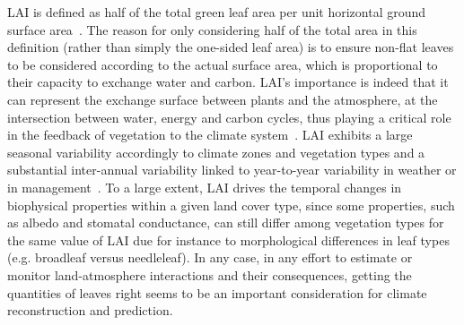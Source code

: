 \documentclass[gmd, manuscript]{copernicus}
\begin{document}
LAI is defined as half of the total green leaf area
per unit horizontal ground surface area~\citep{yan2019review}. The reason for only considering 
half of the total area in this definition (rather than simply the one-sided leaf area) is to ensure 
non-flat leaves to be considered according to the actual surface area, which is proportional to their capacity to exchange water and carbon.
LAI's importance is indeed that it can represent the exchange surface between plants and the atmosphere, at 
the intersection between water, energy and carbon cycles, thus playing a critical role in the 
feedback of vegetation to the climate system~\citep{fang2019overview, Forzieri_2017}. 
LAI exhibits a large seasonal variability accordingly to climate zones and vegetation types and a substantial 
inter-annual variability linked to year-to-year variability
in weather or in management~\citep{boussetta2015assimilation}. To a large extent,
LAI drives the temporal changes in biophysical properties within a given
land cover type, since some properties, such as albedo and stomatal
conductance, can still differ among vegetation types for the same value
of LAI due for instance to morphological differences in leaf types (e.g.
broadleaf versus needleleaf). In any case, in any effort to estimate or
monitor land-atmosphere interactions and their consequences, getting the
quantities of leaves right seems to be an important consideration for
climate reconstruction and prediction.~
\end{document}
